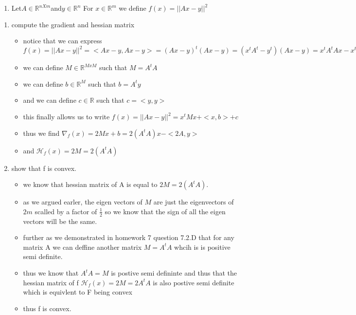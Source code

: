 \documentclass[12pt,twoside]{article}
\begin{document}
\begin{enumerate}[label=9.2]
\newpage
\begin{enumerate}[label=9.3]
\item  Let$A\in \mathbb{R}^{nXm} $and$y\in\mathbb{R}^n$  For $x \in \mathbb{R}^m$
 we define
$f(x) = ||  Ax - y||^2$
\end{enumerate}
\begin{enumerate}
    \item compute the gradient and hessian matrix
    \begin{itemize}
        \item notice that we can express $f(x) = ||  Ax - y||^2=<Ax-y,Ax-y>=(Ax-y)^{t}(Ax-y)=(x^tA^t-y^t)(Ax-y)=x^tA^tAx-x^tA^ty-y^tAx+y^ty=x^tA^tAx-<x,A^ty>-<A^ty,x>+<y,y>=x^tA^tAx-<x,A^ty>-<x,A^ty>+<y,y>$
        \item we can define $M\in \mathbb{R}^{MxM}$ such that $M=A^{t}A$
        \item we can define $b\in \mathbb{R}^{M}$ such that $b=A^ty$
        \item and we can define $c\in \mathbb{R}$ such that $c=<y,y>$
        \item this finally allows us to write $f(x) = ||  Ax - y||^2=x^tMx+<x,b>+c$
        \item thus we find $\nabla_{f}(x)=2Mx+b=2(A^{t}A)x-<2A,y>$        \item and $\mathcal{H}_{f}(x)=2M=2(A^{t}A)$
    \end{itemize}
\item show that f is convex.
\begin{itemize}
    \item we know that hessian matrix of A is equal to $2M=2(A^tA)$.
    \item as we argued earler, the eigen vectors of $M$ are just the eigenvectors of $2m$ scalled by a factor of $\frac{1}{2}$ so we know that the sign of all the eigen vectors will be the same. 
    \item further as  we demonstrated in homework 7 question 7.2.D that for any matrix A we can deffine another matrix $M=A^tA$ whcih is is positive semi definite. 
    \item thus we know that $A^tA=M$ is postive semi defininte and thus that the hessian matrix of f $\mathcal{H}_{f}(x)=2M=2A^tA$ is also postive semi definite which is equivlent to F being convex
    \item thus f is convex.
\end{itemize}
\end{enumerate}
\newpage
\end{enumerate}
\end{document}
